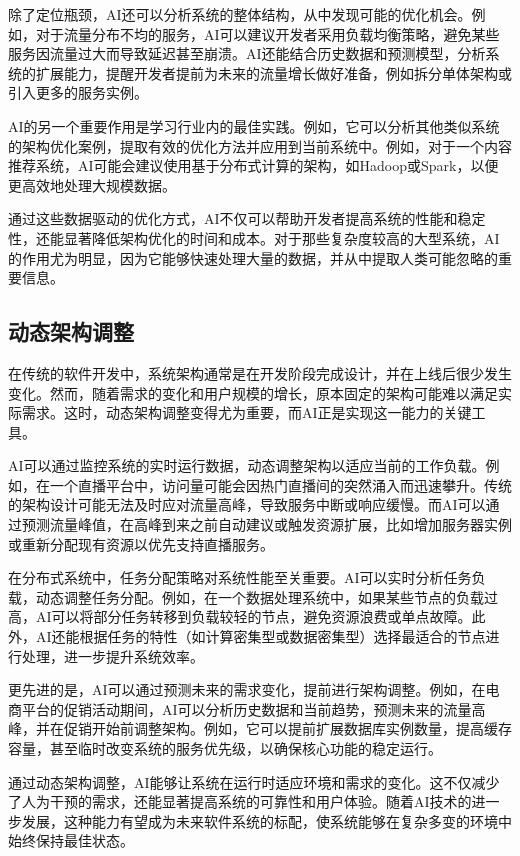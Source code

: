 \documentclass[supercite]{HustGraduPaper}
\begin{document}
除了定位瓶颈，AI还可以分析系统的整体结构，从中发现可能的优化机会。例如，对于流量分布不均的服务，AI可以建议开发者采用负载均衡策略，避免某些服务因流量过大而导致延迟甚至崩溃。AI还能结合历史数据和预测模型，分析系统的扩展能力，提醒开发者提前为未来的流量增长做好准备，例如拆分单体架构或引入更多的服务实例。

AI的另一个重要作用是学习行业内的最佳实践。例如，它可以分析其他类似系统的架构优化案例，提取有效的优化方法并应用到当前系统中。例如，对于一个内容推荐系统，AI可能会建议使用基于分布式计算的架构，如Hadoop或Spark，以便更高效地处理大规模数据。

通过这些数据驱动的优化方式，AI不仅可以帮助开发者提高系统的性能和稳定性，还能显著降低架构优化的时间和成本。对于那些复杂度较高的大型系统，AI的作用尤为明显，因为它能够快速处理大量的数据，并从中提取人类可能忽略的重要信息。

\subsection{动态架构调整}
在传统的软件开发中，系统架构通常是在开发阶段完成设计，并在上线后很少发生变化。然而，随着需求的变化和用户规模的增长，原本固定的架构可能难以满足实际需求。这时，动态架构调整变得尤为重要，而AI正是实现这一能力的关键工具。

AI可以通过监控系统的实时运行数据，动态调整架构以适应当前的工作负载。例如，在一个直播平台中，访问量可能会因热门直播间的突然涌入而迅速攀升。传统的架构设计可能无法及时应对流量高峰，导致服务中断或响应缓慢。而AI可以通过预测流量峰值，在高峰到来之前自动建议或触发资源扩展，比如增加服务器实例或重新分配现有资源以优先支持直播服务。

在分布式系统中，任务分配策略对系统性能至关重要。AI可以实时分析任务负载，动态调整任务分配。例如，在一个数据处理系统中，如果某些节点的负载过高，AI可以将部分任务转移到负载较轻的节点，避免资源浪费或单点故障。此外，AI还能根据任务的特性（如计算密集型或数据密集型）选择最适合的节点进行处理，进一步提升系统效率。

更先进的是，AI可以通过预测未来的需求变化，提前进行架构调整。例如，在电商平台的促销活动期间，AI可以分析历史数据和当前趋势，预测未来的流量高峰，并在促销开始前调整架构。例如，它可以提前扩展数据库实例数量，提高缓存容量，甚至临时改变系统的服务优先级，以确保核心功能的稳定运行。

通过动态架构调整，AI能够让系统在运行时适应环境和需求的变化。这不仅减少了人为干预的需求，还能显著提高系统的可靠性和用户体验。随着AI技术的进一步发展，这种能力有望成为未来软件系统的标配，使系统能够在复杂多变的环境中始终保持最佳状态。
	
\end{document}
